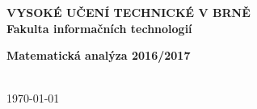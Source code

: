 \begin{titlepage}
	\centering

	{\fontsize{20pt}{15pt}\bfseries 
		VYSOKÉ UČENÍ TECHNICKÉ V BRNĚ\\
		\vspace{8pt}
		Fakulta informačních technologií
	}

	\vspace*{64pt}

	\begin{figure}[H]
		\centering
		
	\end{figure}

	\vspace*{\fill}

	{\LARGE \bfseries Matematická analýza 2016/2017\\}
	\vspace*{4pt}
	{\Large \thetitle}

	\vspace*{64pt}

	{\Large \theauthor\\}
	\vspace*{64pt}
	{\Large \today}

\end{titlepage}